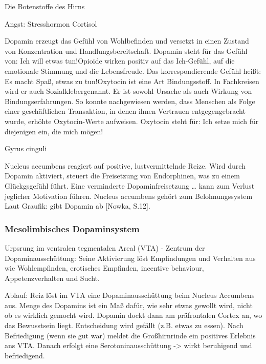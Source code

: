Die Botenstoffe des Hirns

Angst: Stresshormon Cortisol

\glqq Dopamin erzeugt das Gefühl von Wohlbefinden und versetzt in einen Zustand von Konzentration und Handlungsbereitschaft. Dopamin steht für das Gefühl von: \glqq Ich will etwas tun!\grqq \grqq [Seelbach, S. 18]
\glqq Opioide wirken positiv auf das Ich-Gefühl, auf die emotionale Stimmung und die Lebensfreude. Das korrespondierende Gefühl heißt: \glqq Es macht Spaß, etwas zu tun!\grqq \grqq[Seelbach, S. 18]
\glqq Oxytocin ist eine Art Bindungsstoff. In Fachkreisen wird er auch \glqq Sozialkleber\grqq genannt. Er ist sowohl Ursache als auch Wirkung von Bindungserfahrungen. So konnte nachgewiesen werden, dass Menschen als Folge einer geschäftlichen Transaktion, in denen ihnen Vertrauen entgegengebracht wurde, erhöhte Oxytocin-Werte aufweisen. Oxytocin steht für: \glqq Ich setze mich für diejenigen ein, die mich mögen!\grqq \grqq[Seelbach, S. 18]


Gyrus cinguli

Nucleus accumbens
reagiert auf positive, lustvermittelnde Reize. Wird durch Dopamin aktiviert, steuert die Freisetzung von Endorphinen, was zu einem Glückgsgefühl führt. \glqq Eine verminderte Dopaminfreisetzung … kann zum Verlust jeglicher Motivation führen\grqq [Nowka, S. 11]. 
Nucleus accumbens gehört zum Belohnungssystem
Laut Graufik: gibt Dopamin ab [Nowka, S.12].

\subsubsection{Mesolimbisches Dopaminsystem}
Urpsrung im ventralen tegmentalen Areal (VTA) - Zentrum der Dopaminausschüttung:
\glqq Seine Aktivierung löst Empfindungen und Verhalten aus wie Wohlempfinden, erotisches
Empfinden, \glqq incentive behaviour\grqq, Appetenzverhalten und Sucht. 

Ablauf: 
Reiz löst im VTA eine Dopaminausschüttung beim Nucleus Accumbens aus.
Menge des Dopamins ist ein Maß dafür, wie sehr etwas gewollt wird, nicht ob es wirklich gemocht wird. 
Dopamin dockt dann am präfrontalen Cortex an, wo das Bewusstsein liegt. Entscheidung wird gefällt (z.B. etwas zu essen). Nach Befriedigung (wenn sie gut war) meldet die Großhirnrinde ein positives Erlebnis ans VTA. Danach erfolgt eine Serotoninausschüttung -> wirkt beruhigend und befriedigend.

